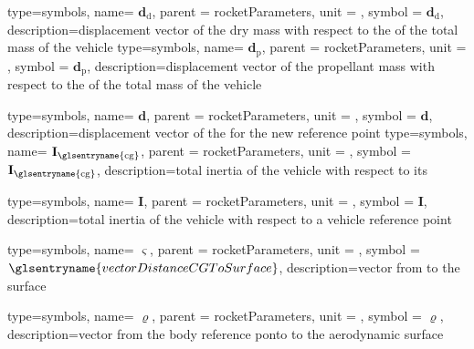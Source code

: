 {type=symbols,
  name= \ensuremath{\mathbf{d}_\mathrm{d}},
  parent = {rocketParameters},
  unit = \unexpanded{\si{\meter}},
  symbol = \ensuremath{\mathbf{d}_\mathrm{d}},
  description={displacement vector of the dry mass with respect to the  of the total mass of the vehicle}
}
{type=symbols,
  name= \ensuremath{\mathbf{d}_\mathrm{p}},
  parent = {rocketParameters},
  unit = \unexpanded{\si{\meter}},
  symbol = \ensuremath{\mathbf{d}_\mathrm{p}},
  description={displacement vector of the propellant mass with respect to the  of the total mass of the vehicle}
}

{type=symbols,
  name= \ensuremath{\mathbf{d}},
  parent = {rocketParameters},
  unit = \unexpanded{\si{\meter}},
  symbol = \ensuremath{\mathbf{d}},
  description={displacement vector of the   for the new reference point}
}
{type=symbols,
  name= \ensuremath{\mathbf{I}_\mathrm{\glsentryname{cg}}},
  parent = {rocketParameters},
  unit = \unexpanded{\si{\kilogram\meter\squared}},
  symbol = \ensuremath{\mathbf{I}_\mathrm{\glsentryname{cg}}},
  description={total inertia of the vehicle with respect to its }
}

{type=symbols,
  name= \ensuremath{\mathbf{I}},
  parent = {rocketParameters},
  unit = \unexpanded{\si{\kilogram\meter\squared}},
  symbol = \ensuremath{\mathbf{I}},
  description={total inertia of the vehicle with respect to a vehicle reference point}
}

{type=symbols,
  name= \ensuremath{\boldsymbol{\varsigma}},
  parent = {rocketParameters},
  unit = \unexpanded{\si{\meter}},
  symbol = \ensuremath{\glsentryname{vectorDistanceCGToSurface}},
  description={vector from  to the surface}  
}

{type=symbols,
  name= \ensuremath{\boldsymbol{\varrho}},
  parent = {rocketParameters},
  unit = \unexpanded{\si{\meter}},
  symbol = \ensuremath{\boldsymbol{\varrho}},
  description={vector from the body reference ponto to the aerodynamic surface}  
}

